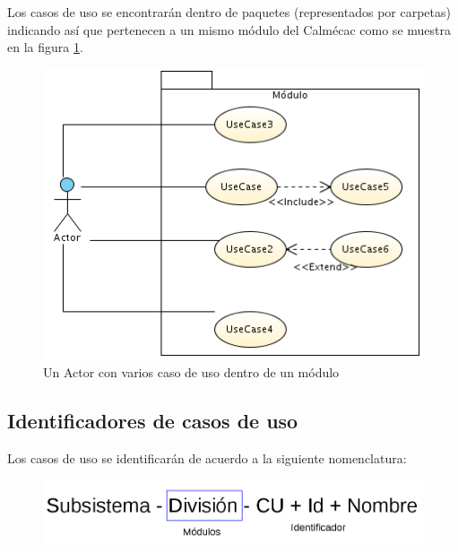 Los casos de uso se encontrarán dentro de paquetes (representados por carpetas) indicando así que pertenecen a un mismo módulo del Calmécac como se muestra en la figura \ref{fig:pack}.

\begin{figure}[hbtp!]
	\begin{center}
		\includegraphics[width=.4\textwidth]{introduccion/images/Paquete}
	\end{center}
	\label{fig:pack}
	\caption{Un Actor con varios caso de uso dentro de un módulo}
\end{figure}

\pagebreak



\subsection{Identificadores de casos de uso}

Los casos de uso se identificarán de acuerdo a la siguiente nomenclatura:

\begin{figure}[hbtp!]
	\begin{center}
		\includegraphics[width=.7\textwidth]{introduccion/images/UCnombre}
	\end{center}
	\label{fig:nomenclatura}
\end{figure}



